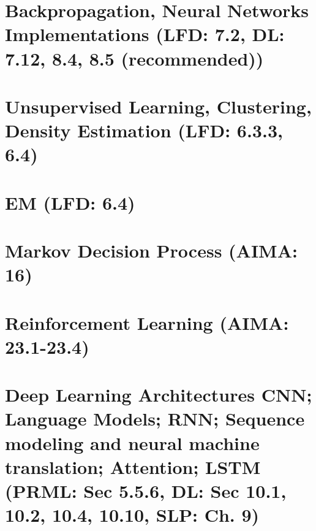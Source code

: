 \documentclass{article}
\begin{document}
\section{Backpropagation, Neural Networks Implementations (LFD: 7.2, DL: 7.12, 8.4, 8.5 (recommended))}

\newpage

\section{Unsupervised Learning, Clustering, Density Estimation (LFD: 6.3.3, 6.4)}

\newpage

\section{EM (LFD: 6.4)}

\newpage

\section{Markov Decision Process (AIMA: 16)}

\newpage

\section{Reinforcement Learning (AIMA: 23.1-23.4)}

\newpage

\section{Deep Learning Architectures CNN; Language Models; RNN; Sequence modeling and neural machine translation; Attention; LSTM (PRML: Sec 5.5.6, DL: Sec 10.1, 10.2, 10.4, 10.10, SLP: Ch. 9)}

\end{document}

